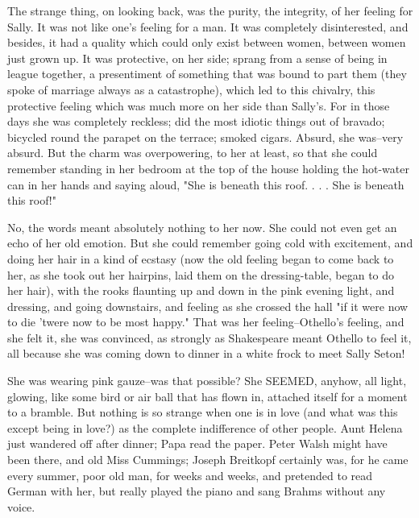 \documentclass[lang=cn,10pt]{elegantbook}
\begin{document}
The strange thing, on looking back, was the purity, the integrity,
of her feeling for Sally.  It was not like one's feeling for a man.
It was completely disinterested, and besides, it had a quality
which could only exist between women, between women just grown up.
It was protective, on her side; sprang from a sense of being in
league together, a presentiment of something that was bound to part
them (they spoke of marriage always as a catastrophe), which led to
this chivalry, this protective feeling which was much more on her
side than Sally's.  For in those days she was completely reckless;
did the most idiotic things out of bravado; bicycled round the
parapet on the terrace; smoked cigars.  Absurd, she was--very
absurd.  But the charm was overpowering, to her at least, so that
she could remember standing in her bedroom at the top of the house
holding the hot-water can in her hands and saying aloud, "She is
beneath this roof. . . .  She is beneath this roof!"

No, the words meant absolutely nothing to her now.  She could not
even get an echo of her old emotion.  But she could remember going
cold with excitement, and doing her hair in a kind of ecstasy (now
the old feeling began to come back to her, as she took out her
hairpins, laid them on the dressing-table, began to do her hair),
with the rooks flaunting up and down in the pink evening light, and
dressing, and going downstairs, and feeling as she crossed the hall
"if it were now to die 'twere now to be most happy."  That was her
feeling--Othello's feeling, and she felt it, she was convinced, as
strongly as Shakespeare meant Othello to feel it, all because she
was coming down to dinner in a white frock to meet Sally Seton!

She was wearing pink gauze--was that possible?  She SEEMED, anyhow,
all light, glowing, like some bird or air ball that has flown in,
attached itself for a moment to a bramble.  But nothing is so
strange when one is in love (and what was this except being in
love?) as the complete indifference of other people.  Aunt Helena
just wandered off after dinner; Papa read the paper.  Peter Walsh
might have been there, and old Miss Cummings; Joseph Breitkopf
certainly was, for he came every summer, poor old man, for weeks
and weeks, and pretended to read German with her, but really played
the piano and sang Brahms without any voice.
\end{document}
